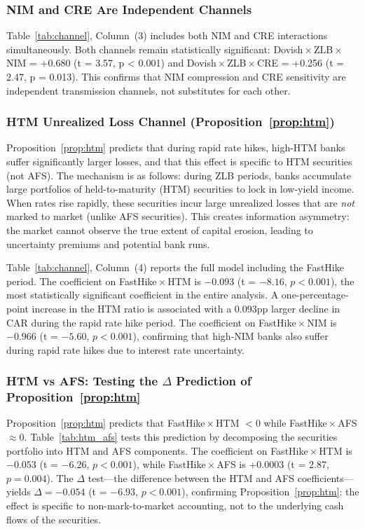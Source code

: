 \documentclass[12pt,a4paper]{article}
\begin{document}
\subsubsection{NIM and CRE Are Independent Channels}

Table~\ref{tab:channel}, Column~(3) includes both NIM and CRE interactions simultaneously. Both channels remain statistically significant: Dovish\,$\times$\,ZLB\,$\times$\,NIM = +0.680 (t = 3.57, p < 0.001) and Dovish\,$\times$\,ZLB\,$\times$\,CRE = +0.256 (t = 2.47, p = 0.013). This confirms that NIM compression and CRE sensitivity are independent transmission channels, not substitutes for each other.

\subsubsection{HTM Unrealized Loss Channel (Proposition~\ref{prop:htm})}

Proposition~\ref{prop:htm} predicts that during rapid rate hikes, high-HTM banks suffer significantly larger losses, and that this effect is specific to HTM securities (not AFS). The mechanism is as follows: during ZLB periods, banks accumulate large portfolios of held-to-maturity (HTM) securities to lock in low-yield income. When rates rise rapidly, these securities incur large unrealized losses that are \textit{not} marked to market (unlike AFS securities). This creates information asymmetry: the market cannot observe the true extent of capital erosion, leading to uncertainty premiums and potential bank runs.

Table~\ref{tab:channel}, Column~(4) reports the full model including the FastHike period. The coefficient on FastHike\,$\times$\,HTM is $-0.093$ (t = $-8.16$, $p < 0.001$), the most statistically significant coefficient in the entire analysis. A one-percentage-point increase in the HTM ratio is associated with a 0.093pp larger decline in CAR during the rapid rate hike period. The coefficient on FastHike\,$\times$\,NIM is $-0.966$ (t = $-5.60$, $p < 0.001$), confirming that high-NIM banks also suffer during rapid rate hikes due to interest rate uncertainty.

\subsubsection{HTM vs AFS: Testing the $\Delta$ Prediction of Proposition~\ref{prop:htm}}

Proposition~\ref{prop:htm} predicts that FastHike\,$\times$\,HTM $< 0$ while FastHike\,$\times$\,AFS $\approx 0$. Table~\ref{tab:htm_afs} tests this prediction by decomposing the securities portfolio into HTM and AFS components. The coefficient on FastHike\,$\times$\,HTM is $-0.053$ (t = $-6.26$, $p < 0.001$), while FastHike\,$\times$\,AFS is $+0.0003$ (t = $2.87$, $p = 0.004$). The $\Delta$ test---the difference between the HTM and AFS coefficients---yields $\Delta = -0.054$ (t = $-6.93$, $p < 0.001$), confirming Proposition~\ref{prop:htm}: the effect is specific to non-mark-to-market accounting, not to the underlying cash flows of the securities.
\end{document}
